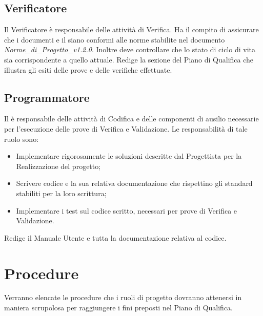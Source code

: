 \subsection{Verificatore}
\label{2.5}
Il Verificatore è responsabile delle attività di Verifica. Ha il compito di assicurare che i documenti e il  siano conformi alle norme stabilite nel documento \emph{Norme\_di\_Progetto\_v1.2.0}. Inoltre deve controllare che lo stato di ciclo di vita sia corrispondente a quello attuale.
Redige la sezione del Piano di Qualifica che illustra gli esiti delle prove e delle verifiche effettuate.

\subsection{Programmatore}
\label{2.6}
Il  è responsabile delle attività di Codifica e delle componenti di ausilio
necessarie per l'esecuzione delle prove di Verifica e Validazione. Le responsabilità di tale ruolo sono:
\begin{itemize}
\item Implementare rigorosamente le soluzioni descritte dal Progettista per la Realizzazione del progetto;
\item Scrivere codice e la sua relativa documentazione che rispettino gli standard stabiliti per la loro scrittura;
\item Implementare i test sul codice scritto, necessari per prove di Verifica e Validazione.
\end{itemize}
Redige il Manuale Utente e tutta la documentazione relativa al codice.



\newpage
\section{Procedure}
\label{6.0}
Verranno elencate le procedure che i ruoli di progetto dovranno attenersi in maniera scrupolosa per raggiungere i fini preposti nel Piano di Qualifica.

